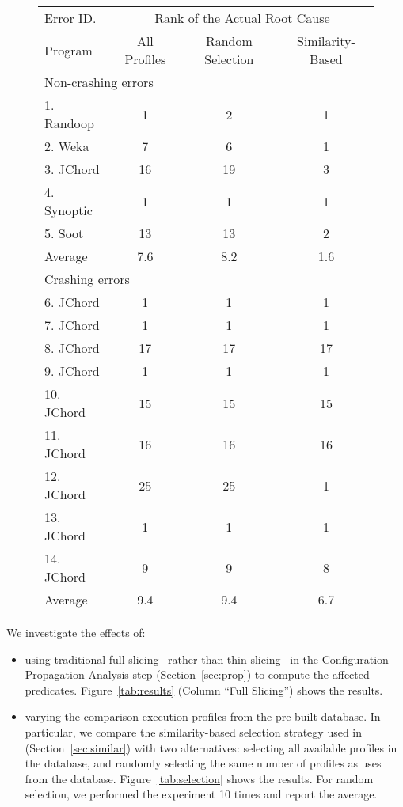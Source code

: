 \begin{figure}[t]
\setlength{\tabcolsep}{.74\tabcolsep}
\small{
\begin{tabular}{|l|c|c||c|}
\hline
 Error ID. & \multicolumn{3}{|c|}{Rank of the Actual Root Cause} \\
\cline{2-4}
 Program & All Profiles& Random Selection&  Similarity-Based\\
 \hline
\hline
\multicolumn{4}{|l|}{Non-crashing errors}   \\
 \hline
 1. Randoop & 1 & 2 & 1\\
 2. Weka & 7 & 6 & 1\\
 3. JChord & 16 & 19 & 3\\
 4. Synoptic & 1 & 1 & 1\\
 5. Soot & 13 & 13 & 2\\
\hline
Average & 7.6 & 8.2 & 1.6 \\
\hline
\hline
\multicolumn{4}{|l|}{Crashing errors}   \\
\hline
 6. JChord & 1 & 1 &1\\
 7. JChord & 1 & 1 &1\\
 8. JChord & 17 & 17 &17\\
 9. JChord & 1 &  1&1\\
 10. JChord & 15 & 15 &15\\
 11. JChord & 16 & 16 &16\\
 12. JChord & 25 & 25 &1\\
 13. JChord & 1 & 1 &1\\
 14. JChord & 9 & 9 &8\\
\hline
Average & 9.4 & 9.4 & 6.7\\
\hline
\end{tabular}
}
\vspace{-2mm}
\end{figure}

We investigate the effects of:

\begin{itemize}
\item using traditional full slicing~\cite{Horwitz:1988} rather
than thin slicing~\cite{Sridharan:2007} in the Configuration
Propagation Analysis step (Section~\ref{sec:prop}) to compute the affected predicates.
Figure~\ref{tab:results}  (Column ``Full Slicing'') shows the results.
\item varying the comparison execution profiles from the pre-built database.
In particular, we compare the similarity-based selection strategy used in \ourtool
 (Section~\ref{sec:similar}) with two alternatives: selecting
all available profiles in the database, and
randomly selecting the same number of profiles as \ourtool uses from the database.
Figure~\ref{tab:selection} shows the results. For random selection, we
performed the experiment 10 times and report the average.
\end{itemize}


